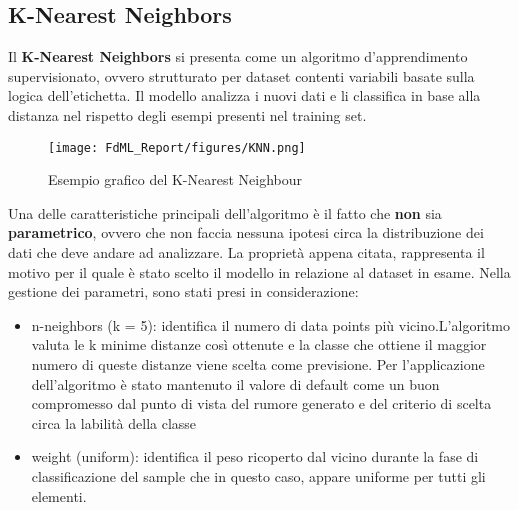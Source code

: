 \documentclass[10pt,a4paper]{article}
\begin{document}
\subsection{K-Nearest Neighbors}
Il \textbf{K-Nearest Neighbors} si presenta come un algoritmo d'apprendimento supervisionato, ovvero strutturato per dataset contenti variabili basate sulla logica dell'etichetta.
\hfill \break
Il modello analizza i nuovi dati e li classifica in base alla distanza nel rispetto degli esempi presenti nel training set.

\begin{figure}[ht]
    \centering
    \texttt{[image: FdML\_Report/figures/KNN.png]}
    \caption{Esempio grafico del K-Nearest Neighbour}
    \label{fig:my_label}
\end{figure}

Una delle caratteristiche principali dell'algoritmo è il fatto che \textbf{non} sia \textbf{parametrico}, ovvero che non faccia nessuna ipotesi circa la distribuzione dei dati che deve andare ad analizzare. \hfill \break
La proprietà appena citata, rappresenta il motivo per il quale è stato scelto il modello in relazione al dataset in esame.
Nella gestione dei parametri, sono stati presi in considerazione:

\begin{itemize}
    \item n-neighbors (k = 5): identifica il numero di data points più vicino.\hfill \break L’algoritmo valuta le k minime distanze così ottenute e la classe che ottiene il maggior numero di queste distanze viene scelta come previsione.
    Per l'applicazione dell'algoritmo è stato mantenuto il valore di default come un buon compromesso dal punto di vista del rumore generato e del criterio di scelta circa la labilità della classe
\end{itemize}

\begin{itemize}
    \item weight (uniform): identifica il peso ricoperto dal vicino durante la fase di classificazione del sample che in questo caso, appare uniforme per tutti gli elementi.
\end{itemize}

\clearpage
\end{document}

